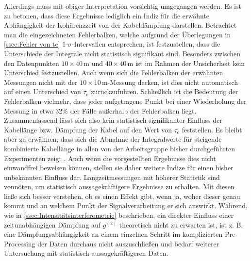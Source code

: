 Allerdings muss mit obiger Interpretation vorsichtig umgegangen werden. 
Es ist zu betonen, dass diese Ergebnisse lediglich ein Indiz für die erwähnte Abhängigkeit der Kohärenzzeit von der Kabeldämpfung darstellen. 
Betrachtet man die eingezeichneten Fehlerbalken, welche aufgrund der Überlegungen in \autoref{ssec:Fehler von tc} 1-$\sigma$-Intervallen entsprechen, ist festzustellen, dass die Unterschiede der Integrale nicht statistisch signifikant sind. 
Besonders zwischen den Datenpunkten $10\times 40\,\mathrm{m}$ und $40\times 40\,\mathrm{m}$ ist im Rahmen der Unsicherheit kein Unterschied festzustellen. 
Auch wenn sich die Fehlerbalken der erwähnten Messungen nicht mit der $10\times 10\,\mathrm{m}$-Messung decken, ist dies nicht automatisch auf einen Unterschied von $\tau_{\mathrm{c}}$ zurückzuführen. 
Schließlich ist die Bedeutung der Fehlerbalken vielmehr, dass jeder aufgetragene Punkt bei einer Wiederholung der Messung in etwa 32\% der Fälle außerhalb der Fehlerbalken liegt. 
Zusammenfassend lässt sich also kein statistisch signifikanter Einfluss der Kabellänge bzw. Dämpfung der Kabel auf den Wert von $\tau_{\mathrm{c}}$ feststellen. 
Es bleibt aber zu erwähnen, dass sich die Abnahme der Integralwerte für steigende kombinierte Kabellänge in allen von der Arbeitsgruppe bisher durchgeführten Experimenten zeigt \cite{zmijaFirstIntensityInterferometry2023}. 
Auch wenn die vorgestellten Ergebnisse dies nicht einwandfrei beweisen können, stellen sie daher weitere Indize für einen bisher unbekannten Einfluss dar. 
Langzeitmessungen mit höherer Statistik sind vonnöten, um statistisch aussagekräftigere Ergebnisse zu erhalten. 
Mit diesen ließe sich besser verstehen, ob es einen Effekt gibt, wenn ja, woher dieser genau kommt und an welchem Punkt der Signalverarbeitung er sich auswirkt. 
Während, wie in \autoref{ssec:Intensitätsinterferometrie} beschrieben, ein direkter Einfluss einer zeitunabhängigen Dämpfung auf $g^{(2)}$ theoretisch nicht zu erwarten ist, ist z. B. eine Dämpfungsabhängigkeit an einem einzelnen Schritt im komplizierten Pre-Processing der Daten durchaus nicht auszuschließen und bedarf weiterer Untersuchung mit statistisch aussagekräftigeren Daten. 


